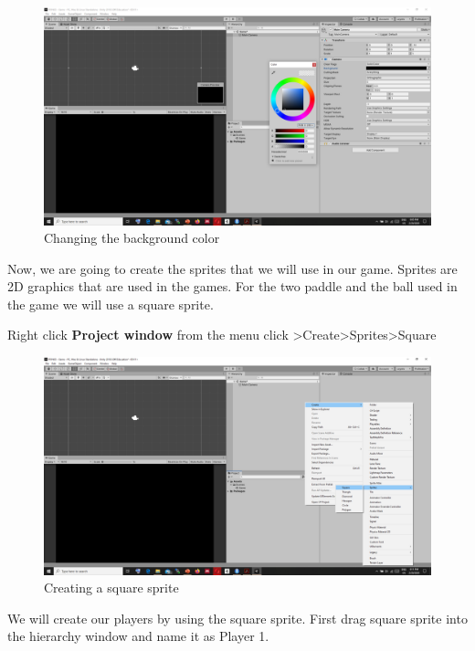 \documentclass[
]{book}
\begin{document}
\begin{figure}
\centering
\includegraphics{Images/Backgrounf.png}
\caption{Changing the background color}
\end{figure}

Now, we are going to create the sprites that we will use in our game. Sprites are 2D graphics that are used in the games. For the two paddle and the ball used in the game we will use a square sprite.

Right click \textbf{Project window} from the menu click \textgreater Create\textgreater Sprites\textgreater Square

\begin{figure}
\centering
\includegraphics{Images/creatingSprite.png}
\caption{Creating a square sprite}
\end{figure}

We will create our players by using the square sprite. First drag square sprite into the hierarchy window and name it as Player 1.
\end{document}
